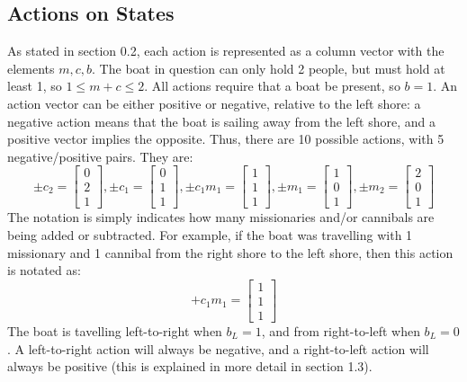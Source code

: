 \documentclass[11pt]{article}
\begin{document}
\subsection{Actions on States}
As stated in section 0.2, each action is represented as a column vector with the elements \(m,c,b\). The boat in question can only hold 2 people, but must hold at least 1, so \(1 \leq m+c \leq 2\). All actions require that a boat be present, so \(b=1\). An action vector can be either positive or negative, relative to the left shore: a negative action means that the boat is sailing away from the left shore, and a positive vector implies the opposite. Thus, there are 10 possible actions, with 5 negative/positive pairs. They are: 
\begin{equation}
\pm c_2=
\begin{bmatrix}
0\\
2\\
1
\end{bmatrix},
\pm c_1=
\begin{bmatrix}
0\\
1\\
1
\end{bmatrix},
\pm c_1m_1=
\begin{bmatrix}
1\\
1\\
1
\end{bmatrix},
\pm m_1=
\begin{bmatrix}
1\\
0\\
1
\end{bmatrix},
\pm m_2=
\begin{bmatrix}
2\\
0\\
1
\end{bmatrix}
\end{equation}
The notation is simply indicates how many missionaries and/or cannibals are being added or subtracted. For example, if the boat was travelling with 1 missionary and 1 cannibal from the right shore to the left shore, then this action is notated as:
\begin{equation}
+c_1m_1=\begin{bmatrix}
1\\
1\\
1
\end{bmatrix}
\end{equation}
The boat is tavelling left-to-right when \(b_L=1\), and from right-to-left when \(b_L=0\). A left-to-right action will always be negative, and a right-to-left action will always be positive (this is explained in more detail in section 1.3). 
\end{document}
